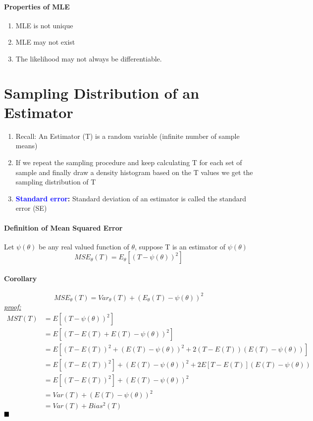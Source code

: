 \documentclass[11pt]{article}
\newcommand{\tb}[1]{\textbf{#1}}
\newcommand{\proof}[0]{\textit{\underline{proof: }}}
\newcommand{\qed}[0]{$\hfill\blacksquare$}
\begin{document}
\paragraph{Properties of MLE}
\begin{enumerate}
	\item MLE is not unique
	\item MLE may not exist
	\item The likelihood may not always be differentiable.
\end{enumerate}
\section{Sampling Distribution of an Estimator}
\begin{enumerate}
	\item Recall: An Estimator (T) is a random variable (infinite number of sample means)
	\item If we repeat the sampling procedure and keep calculating T for each set of sample and finally draw a density histogram based on the T values we get the sampling distribution of T
	\item \tb{\textcolor{blue}{Standard error}:} Standard deviation of an estimator is called the standard error (SE)
\end{enumerate}

\paragraph{Definition of Mean Squared Error}
Let $\psi(\theta)$ be any real valued function of $\theta$, suppose T is an estimator of $\psi(\theta)$
$$MSE_\theta(T) = E_\theta[(T - \psi(\theta))^2]$$
\paragraph{Corollary}
$$MSE_\theta(T) = Var_\theta(T) + (E_\theta(T) - \psi(\theta))^2$$
\proof
\begin{align*}
	MST(T) &= E[(T - \psi({\theta}))^2] \\
	&= E[(T - E(T) + E(T) - \psi({\theta}))^2] \\
	&= E[(T - E(T))^2 + (E(T) - \psi({\theta}))^2 + 2(T-E(T))(E(T)-\psi({\theta}))] \\
	&= E[(T - E(T))^2] + (E(T) - \psi({\theta}))^2 +  2E[T-E(T)](E(T)-\psi({\theta}))\\
	&= E[(T - E(T))^2] + (E(T) - \psi({\theta}))^2 \tag{Since $E[T-E(T)] =  E(T)-E(T) = 0$}\\
	&= Var(T) + (E(T) - \psi({\theta}))^2\\
	&= Var(T) + Bias^2(T)
\end{align*}\qed
\end{document}
